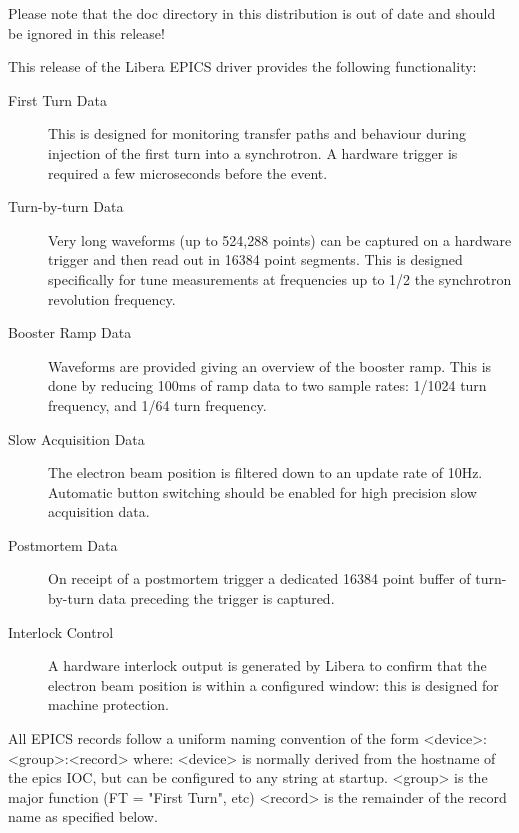 \documentclass[a4paper,fleqn]{article}
\begin{document}
Please note that the doc directory in this distribution is out of date and
should be ignored in this release!


This release of the Libera EPICS driver provides the following functionality:

\begin{description}
\item[First Turn Data]
    This is designed for monitoring transfer paths and behaviour during
    injection of the first turn into a synchrotron.  A hardware trigger is
    required a few microseconds before the event.

\item[Turn-by-turn Data]
    Very long waveforms (up to 524,288 points) can be captured on a hardware
    trigger and then read out in 16384 point segments.  This is designed
    specifically for tune measurements at frequencies up to 1/2 the
    synchrotron revolution frequency.

\item[Booster Ramp Data]
    Waveforms are provided giving an overview of the booster ramp.  This is
    done by reducing 100ms of ramp data to two sample rates: 1/1024 turn
    frequency, and 1/64 turn frequency.

\item[Slow Acquisition Data]
    The electron beam position is filtered down to an update rate of 10Hz.
    Automatic button switching should be enabled for high precision slow
    acquisition data.

\item[Postmortem Data]
    On receipt of a postmortem trigger a dedicated 16384 point buffer of
    turn-by-turn data preceding the trigger is captured.

\item[Interlock Control]
    A hardware interlock output is generated by Libera to confirm that the
    electron beam position is within a configured window: this is designed for
    machine protection.
\end{description}

All EPICS records follow a uniform naming convention of the form
    <device>:<group>:<record>
where:
    <device> is normally derived from the hostname of the epics IOC, but can
        be configured to any string at startup.  
    <group> is the major function (FT = "First Turn", etc)
    <record> is the remainder of the record name as specified below.
\end{document}
